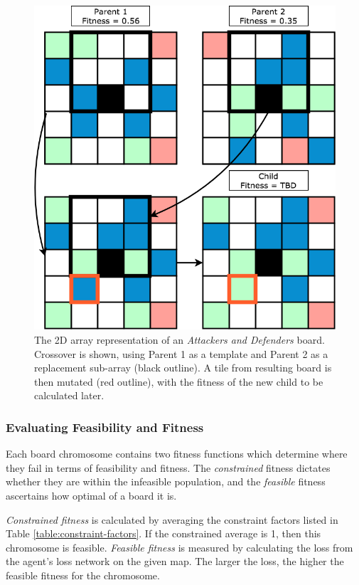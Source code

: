 \documentclass[letterpaper]{article} %
\begin{document}
\begin{figure}[h]
\begin{center}
\includegraphics[height=0.8\linewidth]{graphics/map-crossover.png}
\caption{The 2D array representation of an \textit{Attackers and Defenders} board. Crossover is shown, using Parent 1 as a template and Parent 2 as a replacement sub-array (black outline). A tile from resulting board is then mutated (red outline), with the fitness of the new child to be calculated later.}
\label{fig:map-crossover}
\end{center}
\end{figure}

\subsubsection{Evaluating Feasibility and Fitness}
Each board chromosome contains two fitness functions which determine where they fail in terms of feasibility and fitness. The \emph{constrained} fitness dictates whether they are within the infeasible population, and the \emph{feasible} fitness ascertains how optimal of a board it is.

\emph{Constrained fitness} is calculated by averaging the constraint factors listed in Table \ref{table:constraint-factors}. If the constrained average is 1, then this chromosome is feasible.
\emph{Feasible fitness} is measured by calculating the loss from the agent's loss network on the given map. The larger the loss, the higher the feasible fitness for the chromosome.
\end{document}
